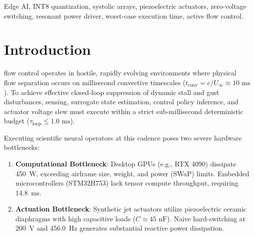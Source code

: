 \documentclass[journal,10pt,twocolumn]{IEEEtran}
\begin{document}
\begin{IEEEkeywords}
Edge AI, INT8 quantization, systolic arrays, piezoelectric actuators, zero-voltage switching, resonant power driver, worst-case execution time, active flow control.
\end{IEEEkeywords}

\section{Introduction}
 flow control operates in hostile, rapidly evolving environments where physical flow separation occurs on millisecond convective timescales ($t_{\text{conv}} = c / U_\infty \approx 10\text{ ms}$). To achieve effective closed-loop suppression of dynamic stall and gust disturbances, sensing, surrogate state estimation, control policy inference, and actuator voltage slew must execute within a strict sub-millisecond deterministic budget ($\tau_{\text{loop}} \le 1.0\text{ ms}$).

Executing scientific neural operators at this cadence poses two severe hardware bottlenecks:
\begin{enumerate}
    \item \textbf{Computational Bottleneck}: Desktop GPUs (e.g., RTX 4090) dissipate 450~W, exceeding airframe size, weight, and power (SWaP) limits. Embedded microcontrollers (STM32H753) lack tensor compute throughput, requiring 14.8~ms.
    \item \textbf{Actuation Bottleneck}: Synthetic jet actuators utilize piezoelectric ceramic diaphragms with high capacitive loads ($C \approx 45\text{ nF}$). Naive hard-switching at 200~V and 456.0~Hz generates substantial reactive power dissipation.
\end{enumerate}

\begin{table}[h]
\caption{Edge Inference Profiling and Energy Consumption Across Hardware Platforms}
\label{tab:hardware_comp}
\centering
\footnotesize
{}
\end{table}
\end{document}
